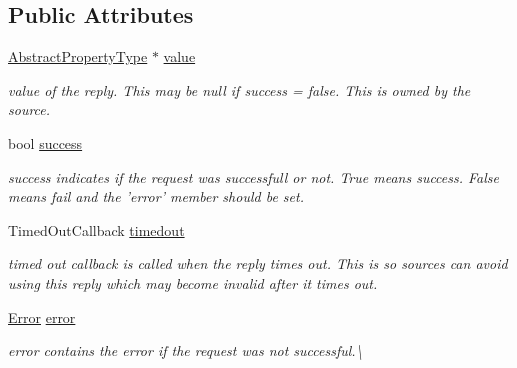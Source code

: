 \subsection*{Public Attributes}
\begin{DoxyCompactItemize}
\item 
\hypertarget{classAsyncPropertyReply_a133699682d0376614b08b162f81c2b02}{\hyperlink{classAbstractPropertyType}{Abstract\+Property\+Type} $\ast$ \hyperlink{classAsyncPropertyReply_a133699682d0376614b08b162f81c2b02}{value}}\label{classAsyncPropertyReply_a133699682d0376614b08b162f81c2b02}

\begin{DoxyCompactList}\small\item\em value of the reply. This may be null if success = false. This is owned by the source. \end{DoxyCompactList}\item 
\hypertarget{classAsyncPropertyReply_aed1f10990a65664ce0c630039cae01bb}{bool \hyperlink{classAsyncPropertyReply_aed1f10990a65664ce0c630039cae01bb}{success}}\label{classAsyncPropertyReply_aed1f10990a65664ce0c630039cae01bb}

\begin{DoxyCompactList}\small\item\em success indicates if the request was successfull or not. True means success. False means fail and the 'error' member should be set. \end{DoxyCompactList}\item 
\hypertarget{classAsyncPropertyReply_a64b8443702607f990ea36e6aaa16b0a5}{Timed\+Out\+Callback \hyperlink{classAsyncPropertyReply_a64b8443702607f990ea36e6aaa16b0a5}{timedout}}\label{classAsyncPropertyReply_a64b8443702607f990ea36e6aaa16b0a5}

\begin{DoxyCompactList}\small\item\em timed out callback is called when the reply times out. This is so sources can avoid using this reply which may become invalid after it times out. \end{DoxyCompactList}\item 
\hyperlink{classAsyncPropertyReply_ad91affaa25fcc3b73947a6cf4591e5d1}{Error} \hyperlink{classAsyncPropertyReply_a8c5cb98a6e2a72d6d94b43449a5e842d}{error}
\begin{DoxyCompactList}\small\item\em error contains the error if the request was not successful.\textbackslash{} \end{DoxyCompactList}\end{DoxyCompactItemize}


